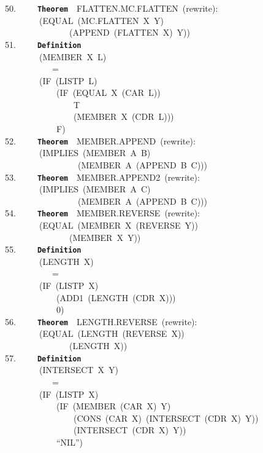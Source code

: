 \documentclass[11pt]{book}
\newenvironment{pubasis}{\begin{flushleft}\ttfamily\small}{\normalsize\rmfamily\end{flushleft}}
\newcommand{\axiomordefinition}[1]{\vspace{6pt}\texttt{\textbf{#1}}}
\begin{document}
\begin{pubasis}
50.~~~~~\axiomordefinition{Theorem}~~FLAT\-TEN.MC.FLAT\-TEN~(rewrite):\\
~~~~~~~~(EQUAL~(MC.FLAT\-TEN~X~Y)\\
~~~~~~~~~~~~~~~(APPEND~(FLATTEN~X)~Y))\\

51.~~~~~\axiomordefinition{Definition}\\
~~~~~~~~(MEMBER~X~L)\\
~~~~~~~~~~~=\\
~~~~~~~~(IF~(LISTP~L)\\
~~~~~~~~~~~~(IF~(EQUAL~X~(CAR~L))\\
~~~~~~~~~~~~~~~~T\\
~~~~~~~~~~~~~~~~(MEMBER~X~(CDR~L)))\\
~~~~~~~~~~~~F)\\

52.~~~~~\axiomordefinition{Theorem}~~MEMBER.APPEND~(rewrite):\\
~~~~~~~~(IMPLIES~(MEMBER~A~B)\\
~~~~~~~~~~~~~~~~~(MEMBER~A~(APPEND~B~C)))\\

53.~~~~~\axiomordefinition{Theorem}~~MEMBER.APPEND2~(rewrite):\\
~~~~~~~~(IMPLIES~(MEMBER~A~C)\\
~~~~~~~~~~~~~~~~~(MEMBER~A~(APPEND~B~C)))\\

54.~~~~~\axiomordefinition{Theorem}~~MEMBER.REVERSE~(rewrite):\\
~~~~~~~~(EQUAL~(MEMBER~X~(REVERSE~Y))\\
~~~~~~~~~~~~~~~(MEMBER~X~Y))\\

55.~~~~~\axiomordefinition{Definition}\\
~~~~~~~~(LENGTH~X)\\
~~~~~~~~~~~=\\
~~~~~~~~(IF~(LISTP~X)\\
~~~~~~~~~~~~(ADD1~(LENGTH~(CDR~X)))\\
~~~~~~~~~~~~0)\\

56.~~~~~\axiomordefinition{Theorem}~~LENGTH.REVERSE~(rewrite):\\
~~~~~~~~(EQUAL~(LENGTH~(REVERSE~X))\\
~~~~~~~~~~~~~~~(LENGTH~X))\\

57.~~~~~\axiomordefinition{Definition}\\
~~~~~~~~(INTERSECT~X~Y)\\
~~~~~~~~~~~=\\
~~~~~~~~(IF~(LISTP~X)\\
~~~~~~~~~~~~(IF~(MEMBER~(CAR~X)~Y)\\
~~~~~~~~~~~~~~~~(CONS~(CAR~X)~(INTERSECT~(CDR~X)~Y))\\
~~~~~~~~~~~~~~~~(INTERSECT~(CDR~X)~Y))\\
~~~~~~~~~~~~``NIL'')\\


\end{pubasis}
\end{document}
